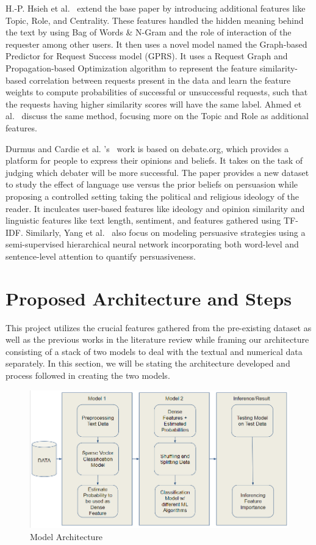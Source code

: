 \documentclass[runningheads]{llncs}
\begin{document}
H.-P. Hsieh et al.~\cite{raop_gprs} extend the base paper by introducing additional features like Topic, Role, and Centrality. These features handled the hidden meaning behind the text by using Bag of Words \& N-Gram and the role of interaction of the requester among other users. It then uses a novel model named the Graph-based Predictor for Request Success model (GPRS). It uses a Request Graph and Propagation-based Optimization algorithm to represent the feature similarity-based correlation between requests present in the data and learn the feature weights to compute probabilities of successful or unsuccessful requests, such that the requests having higher similarity scores will have the same label. Ahmed et al.~\cite{raop_gprs2} discuss the same method, focusing more on the Topic and Role as additional features.

Durmus and Cardie et al. 's~\cite{debate} work is based on debate.org, which provides a platform for people to express their opinions and beliefs. It takes on the task of judging which debater will be more successful. The paper provides a new dataset to study the effect of language use versus the prior beliefs on persuasion while proposing a controlled setting taking the political and religious ideology of the reader. It inculcates user-based features like ideology and opinion similarity and linguistic features like text length, sentiment, and features gathered using TF-IDF. Similarly, Yang et al.~\cite{neural_req1,neural_req2} also focus on modeling persuasive strategies using a semi-supervised hierarchical neural network incorporating both word-level and sentence-level attention to quantify persuasiveness.

\section{Proposed Architecture and Steps}
This project utilizes the crucial features gathered from the pre-existing dataset as well as the previous works in the literature review while framing our architecture consisting of a stack of two models to deal with the textual and numerical data separately. In this section, we will be stating the architecture developed and process followed in creating the two models.

\begin{figure}
\includegraphics[width=\textwidth]{arch_diag.png}
\caption{Model Architecture} \label{fig1}
\end{figure}
\end{document}

